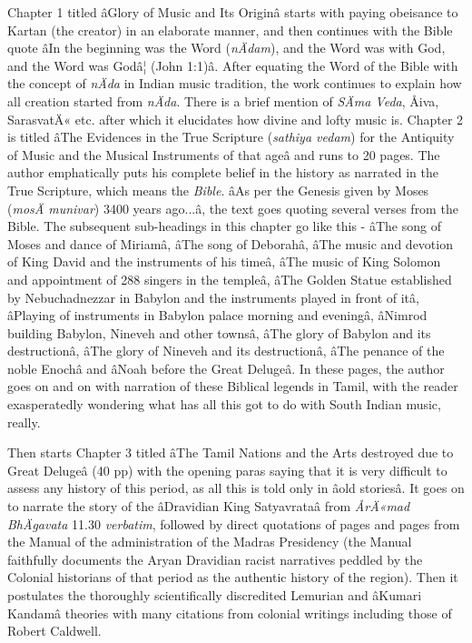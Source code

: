 Chapter 1 titled âGlory of Music and Its Originâ starts with paying obeisance to Kartan (the creator) in an elaborate manner, and then continues with the Bible quote âIn the beginning was the Word (\textit{nÄdam}), and the Word was with God, and the Word was Godâ¦ (John 1:1)â. After equating the Word of the Bible with the concept of \textit{nÄda} in Indian music tradition, the work continues to explain how all creation started from \textit{nÄda}. There is a brief mention of \textit{SÄma Veda}, Åiva, SarasvatÄ« etc. after which it elucidates how divine and lofty music is. Chapter 2 is titled âThe Evidences in the True Scripture (\textit{sathiya vedam}) for the Antiquity of Music and the Musical Instruments of that ageâ and runs to 20 pages. The author emphatically puts his complete belief in the history as narrated in the True Scripture, which means the \textit{Bible}. âAs per the Genesis given by Moses (\textit{mosÄ munivar}) 3400 years ago...â, the text goes quoting several verses from the Bible. The subsequent sub-headings in this chapter go like this - âThe song of Moses and dance of Miriamâ, âThe song of Deborahâ, âThe music and devotion of King David and the instruments of his timeâ, âThe music of King Solomon and appointment of 288 singers in the templeâ, âThe Golden Statue established by Nebuchadnezzar in Babylon and the instruments played in front of itâ, âPlaying of instruments in Babylon palace morning and eveningâ, âNimrod building Babylon, Nineveh and other townsâ, âThe glory of Babylon and its destructionâ, âThe glory of Nineveh and its destructionâ, âThe penance of the noble Enochâ and âNoah before the Great Delugeâ. In these pages, the author goes on and on with narration of these Biblical legends in Tamil, with the reader exasperatedly wondering what has all this got to do with South Indian music, really.

Then starts Chapter 3 titled âThe Tamil Nations and the Arts destroyed due to Great Delugeâ (40 pp) with the opening paras saying that it is very difficult to assess any history of this period, as all this is told only in âold storiesâ. It goes on to narrate the story of the âDravidian King Satyavrataâ from \textit{ÅrÄ«mad BhÄgavata} 11.30 \textit{verbatim}, followed by direct quotations of pages and pages from the Manual of the administration of the Madras Presidency (the Manual faithfully documents the Aryan Dravidian racist narratives peddled by the Colonial historians of that period as the authentic history of the region). Then it postulates the thoroughly scientifically discredited Lemurian and âKumari Kandamâ theories with many citations from colonial writings including those of Robert Caldwell.

